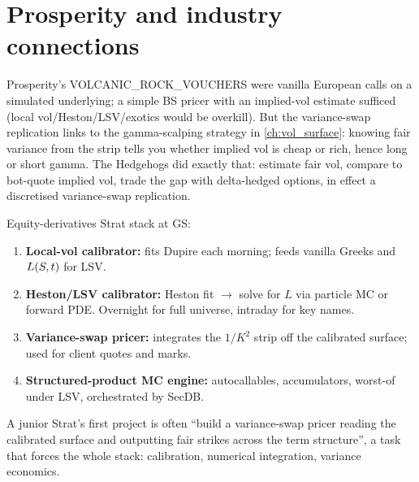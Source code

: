 \section{Prosperity and industry connections}
\label{sec:equity_deriv_connections}

\begin{prosperitybox}
Prosperity's VOLCANIC\_ROCK\_VOUCHERS were vanilla European calls on a
simulated underlying; a simple BS pricer with an implied-vol estimate
sufficed (local vol/Heston/LSV/exotics would be overkill). But the
variance-swap replication links to the gamma-scalping strategy in
\cref{ch:vol_surface}: knowing fair variance from the strip tells you
whether implied vol is cheap or rich, hence long or short gamma. The
Hedgehogs did exactly that: estimate fair vol, compare to bot-quote
implied vol, trade the gap with delta-hedged options, in effect a
discretised variance-swap replication.
\end{prosperitybox}

\begin{gsbox}
Equity-derivatives Strat stack at GS:
\begin{enumerate}
  \item \textbf{Local-vol calibrator:} fits Dupire each morning;
    feeds vanilla Greeks and $L(S,t)$ for LSV.
  \item \textbf{Heston/LSV calibrator:} Heston fit $\to$ solve for
    $L$ via particle MC or forward PDE. Overnight for full universe,
    intraday for key names.
  \item \textbf{Variance-swap pricer:} integrates the $1/K^2$ strip
    off the calibrated surface; used for client quotes and marks.
  \item \textbf{Structured-product MC engine:} autocallables,
    accumulators, worst-of under LSV, orchestrated by SecDB.
\end{enumerate}
A junior Strat's first project is often ``build a variance-swap pricer
reading the calibrated surface and outputting fair strikes across the
term structure'', a task that forces the whole stack: calibration,
numerical integration, variance economics.
\end{gsbox}

